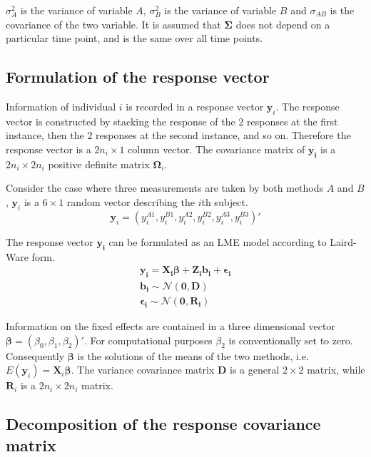 \documentclass[12pt, a4paper]{article}
\theoremstyle{plain}
\theoremstyle{definition}
\theoremstyle{remark}
\begin{document}
$\sigma^2_{A}$ is the variance of variable $A$, $\sigma^2_{B}$ is the variance of variable $B$ and $\sigma_{AB}$ is the covariance of the two variable. It is assumed that $\boldsymbol{\Sigma}$ does not depend on a particular time point, and is the same over all time points.

\subsection{Formulation of the response vector}
 Information of individual $i$ is recorded in a response vector $\boldsymbol{y}_{i}$. The response vector is constructed by stacking the response of the $2$ responses at the first instance, then the $2$ responses at the second instance, and so on. Therefore the response vector is a $2n_{i} \times 1$ column vector.
The covariance matrix of $\boldsymbol{y_{i}}$ is a $2n_{i} \times 2n_{i}$ positive definite matrix $\boldsymbol{\Omega}_{i}$.

Consider the case where three measurements are taken by both methods $A$ and $B$, $\boldsymbol{y}_{i}$ is a $6 \times 1$ random vector describing the $i$th subject.
\[
\boldsymbol{y}_{i} = (y_{i}^{A1},y_{i}^{B1},y_{i}^{A2},y_{i}^{B2},y_{i}^{A3},y_{i}^{B3}) \prime
\]

The response vector $\boldsymbol{y_{i}}$ can be formulated as an LME model according to Laird-Ware form.
\begin{eqnarray*}
\boldsymbol{y_{i}} = \boldsymbol{X_{i}\beta}  + \boldsymbol{Z_{i}b_{i}} + \boldsymbol{\epsilon_{i}}\\
\boldsymbol{b_{i}} \sim \mathcal{N}(\boldsymbol{0,D})\\
\boldsymbol{\epsilon_{i}} \sim \mathcal{N}(\boldsymbol{0,R_{i}})
\end{eqnarray*}

Information on the fixed effects are contained in a three dimensional vector $\boldsymbol{\beta} = (\beta_{0},\beta_{1},\beta_{2})\prime$. For computational purposes $\beta_{2}$ is conventionally set to zero. Consequently $\boldsymbol{\beta}$ is the solutions of the means of the two methods, i.e. $E(\boldsymbol{y}_{i})  = \boldsymbol{X}_{i}\boldsymbol{\beta}$. The variance covariance matrix $\boldsymbol{D}$ is a general $2 \times 2$ matrix, while $\boldsymbol{R}_{i}$ is a $2n_{i} \times 2n_{i}$ matrix.

\subsection{Decomposition of the response covariance matrix}
\end{document}
